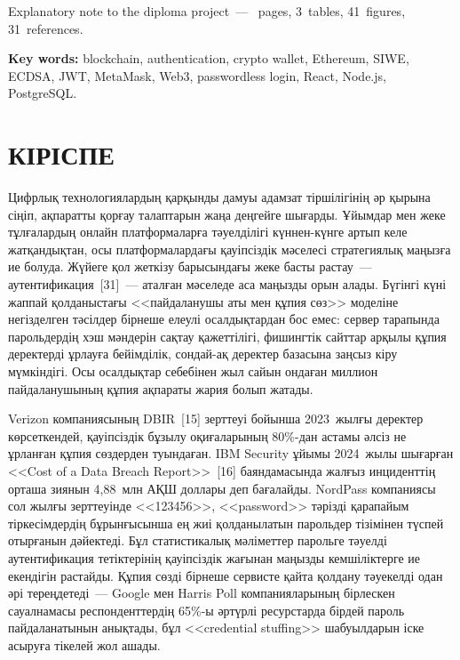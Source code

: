 \documentclass[14pt,a4paper]{extarticle}
\begin{document}
Explanatory note to the diploma project~--- \pageref{LastPage}~pages, 3~tables, 41~figures, 31~references.

\textbf{Key words:} blockchain, authentication, crypto wallet, Ethereum, SIWE, ECDSA, JWT, MetaMask, Web3, passwordless login, React, Node.js, PostgreSQL.

\normalsize
\newpage
{
\pagestyle{empty}
\setcounter{tocdepth}{2}
\renewcommand{\baselinestretch}{1.0}\normalsize
\tableofcontents
\clearpage
}

\newpage
\pagestyle{fancy}
\section*{КІРІСПЕ}

Цифрлық технологиялардың қарқынды дамуы адамзат тіршілігінің әр қырына сіңіп, ақпаратты қорғау талаптарын жаңа деңгейге шығарды. Ұйымдар мен жеке тұлғалардың онлайн платформаларға тәуелділігі күннен-күнге артып келе жатқандықтан, осы платформалардағы қауіпсіздік мәселесі стратегиялық маңызға ие болуда. Жүйеге қол жеткізу барысындағы жеке басты растау~--- аутентификация~[31]~--- аталған мәселеде аса маңызды орын алады. Бүгінгі күні жаппай қолданыстағы <<пайдаланушы аты мен құпия сөз>> моделіне негізделген тәсілдер бірнеше елеулі осалдықтардан бос емес: сервер тарапында парольдердің хэш мәндерін сақтау қажеттілігі, фишингтік сайттар арқылы құпия деректерді ұрлауға бейімділік, сондай-ақ деректер базасына заңсыз кіру мүмкіндігі. Осы осалдықтар себебінен жыл сайын ондаған миллион пайдаланушының құпия ақпараты жария болып жатады.

Verizon компаниясының DBIR~[15] зерттеуі бойынша 2023~жылғы деректер көрсеткендей, қауіпсіздік бұзылу оқиғаларының 80\%-дан астамы әлсіз не ұрланған құпия сөздерден туындаған. IBM Security ұйымы 2024~жылы шығарған <<Cost of a Data Breach Report>>~[16] баяндамасында жалғыз инциденттің орташа зиянын 4,88~млн АҚШ доллары деп бағалайды. NordPass компаниясы сол жылғы зерттеуінде <<123456>>, <<password>> тәрізді қарапайым тіркесімдердің бұрынғысынша ең жиі қолданылатын парольдер тізімінен түспей отырғанын дәйектеді. Бұл статистикалық мәліметтер парольге тәуелді аутентификация тетіктерінің қауіпсіздік жағынан маңызды кемшіліктерге ие екендігін растайды. Құпия сөзді бірнеше сервисте қайта қолдану тәуекелді одан әрі тереңдетеді~--- Google мен Harris Poll компанияларының бірлескен сауалнамасы респонденттердің 65\%-ы әртүрлі ресурстарда бірдей пароль пайдаланатынын анықтады, бұл <<credential stuffing>> шабуылдарын іске асыруға тікелей жол ашады.
\end{document}
